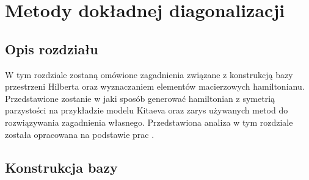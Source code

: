 \chapter{Metody dokładnej diagonalizacji} 
\label{chap:diagonalization}

\section*{Opis rozdziału}

W tym rozdziale zostaną omówione zagadnienia związane z konstrukcją bazy przestrzeni Hilberta oraz wyznaczaniem elementów macierzowych hamiltonianu.
Przedstawione zostanie w jaki sposób generować hamiltonian z symetrią parzystości na przykładzie modelu Kitaeva oraz zarys używanych metod do rozwiązywania zagadnienia własnego.
Przedstawiona analiza w tym rozdziale została opracowana na podstawie prac
\cite{negele.orland.1988,fetter.walecka.2003,sandvik.2010,coleman.2015}.

\section{Konstrukcja bazy}

